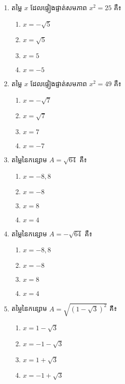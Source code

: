\begin{enumerate}
\item តម្លៃ $x$ ដែលផ្ទៀងផ្ទាត់សមភាព $x^2=25$ គឺ៖
\begin{multicols}{4}
\begin{enumerate}[label=\alph*.]
	\item $x=-\sqrt{5}$
	\item $x=\sqrt{5}$
	\item $x=5$
	\item $x=-5$
\end{enumerate}
\end{multicols}

\item តម្លៃ $x$ ដែលផ្ទៀងផ្ទាត់សមភាព $x^2=49$ គឺ៖
\begin{multicols}{4}
\begin{enumerate}[label=\alph*.]
	\item $x=-\sqrt{7}$
	\item $x=\sqrt{7}$
	\item $x=7$
	\item $x=-7$
\end{enumerate}
\end{multicols}

\item តម្លៃនៃកន្សោម $A=\sqrt{64}$  គឺ៖
\begin{multicols}{4}
\begin{enumerate}[label=\alph*.]
	\item $x=-8,8$
	\item $x=-8$
	\item $x=8$
	\item $x=4$
\end{enumerate}
\end{multicols}

\item តម្លៃនៃកន្សោម $A=-\sqrt{64}$  គឺ៖
\begin{multicols}{4}
\begin{enumerate}[label=\alph*.]
	\item $x=-8,8$
	\item $x=-8$
	\item $x=8$
	\item $x=4$
\end{enumerate}
\end{multicols}

\item តម្លៃនៃកន្សោម $A=\sqrt{\left(1-\sqrt{3}\right)^2}$  គឺ៖
\begin{multicols}{4}
\begin{enumerate}[label=\alph*.]
	\item $x=1-\sqrt{3}$
	\item $x=-1-\sqrt{3}$
	\item $x=1+\sqrt{3}$
	\item $x=-1+\sqrt{3}$
\end{enumerate}
\end{multicols}


\end{enumerate}

